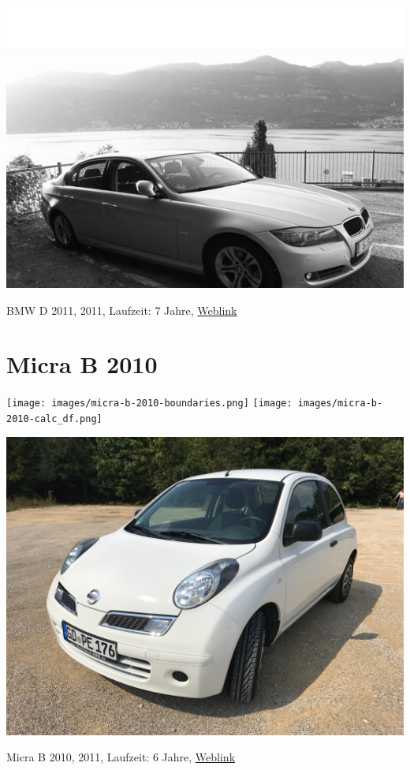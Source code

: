 \documentclass[landscape, DIV=99, 14pt]{scrartcl}
\begin{document}
\pagebreak
\null
\vspace{2cm}
\begin{center}
\includegraphics[width=0.9\columnwidth]{cars/bmw-3er-maximus.png}

BMW D 2011, 2011, Laufzeit: 7 Jahre, \href{https://de.wikipedia.org/wiki/BMW_E90}{Weblink}
\end{center}

\pagebreak


\twocolumn

\section*{Micra B 2010}
\begin{center}
\texttt{[image: images/micra-b-2010-boundaries.png]}
\null
\vspace{0.5cm}
\texttt{[image: images/micra-b-2010-calc\_df.png]}
\end{center}

\pagebreak
\null
\vspace{2cm}
\begin{center}
\includegraphics[width=0.9\columnwidth]{cars/nissan-micra.jpg}

Micra B 2010, 2011, Laufzeit: 6 Jahre, \href{https://de.wikipedia.org/wiki/Nissan_Micra\#Micra_(K12,_2003%E2%80%932010)}{Weblink}
\end{center}
\end{document}
